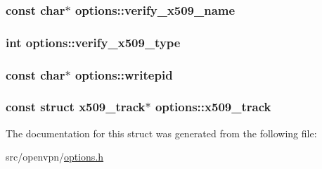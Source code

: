 \subsubsection[{verify\+\_\+x509\+\_\+name}]{\setlength{\rightskip}{0pt plus 5cm}const char$\ast$ options\+::verify\+\_\+x509\+\_\+name}\label{structoptions_acdf0fec84661c4ccdf8bbf01430e3729}
\hypertarget{structoptions_ab7d414e087194f31b1a0f16dec7bd0f9}{}
\subsubsection[{verify\+\_\+x509\+\_\+type}]{\setlength{\rightskip}{0pt plus 5cm}int options\+::verify\+\_\+x509\+\_\+type}\label{structoptions_ab7d414e087194f31b1a0f16dec7bd0f9}
\hypertarget{structoptions_a5c937139ec761b56b6a01395ea310e91}{}
\subsubsection[{writepid}]{\setlength{\rightskip}{0pt plus 5cm}const char$\ast$ options\+::writepid}\label{structoptions_a5c937139ec761b56b6a01395ea310e91}
\hypertarget{structoptions_ac34bf3412bfd7f1c7185e08c3e6d212c}{}
\subsubsection[{x509\+\_\+track}]{\setlength{\rightskip}{0pt plus 5cm}const struct {\bf x509\+\_\+track}$\ast$ options\+::x509\+\_\+track}\label{structoptions_ac34bf3412bfd7f1c7185e08c3e6d212c}


The documentation for this struct was generated from the following file\+:\begin{DoxyCompactItemize}
\item 
src/openvpn/\hyperlink{options_8h}{options.\+h}\end{DoxyCompactItemize}
